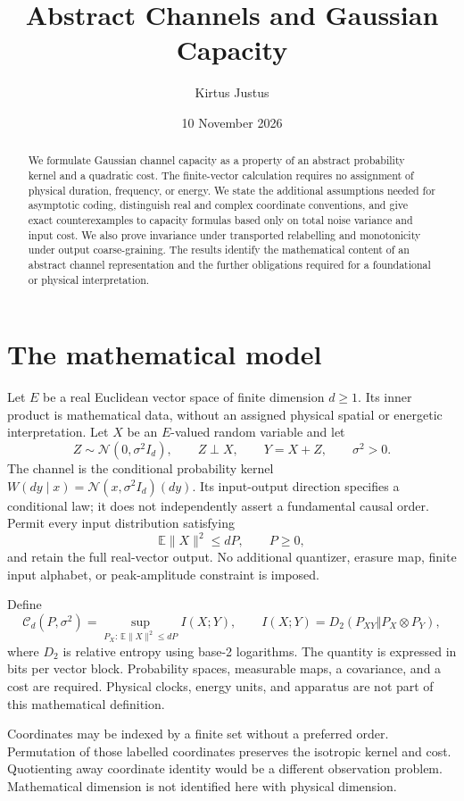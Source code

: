 \documentclass{article}
\title{Abstract Channels and Gaussian Capacity}
\author{Kirtus Justus}
\date{10 November 2026}
\begin{document}
\maketitle
\begin{abstract}
We formulate Gaussian channel capacity as a property of an abstract probability kernel and a quadratic cost. The finite-vector calculation requires no assignment of physical duration, frequency, or energy. We state the additional assumptions needed for asymptotic coding, distinguish real and complex coordinate conventions, and give exact counterexamples to capacity formulas based only on total noise variance and input cost. We also prove invariance under transported relabelling and monotonicity under output coarse-graining. The results identify the mathematical content of an abstract channel representation and the further obligations required for a foundational or physical interpretation.
\end{abstract}

\section{The mathematical model}
Let \(E\) be a real Euclidean vector space of finite dimension \(d\ge1\). Its inner product is mathematical data, without an assigned physical spatial or energetic interpretation. Let \(X\) be an \(E\)-valued random variable and let
\[
Z\sim\mathcal N(0,\sigma^2I_d),\qquad Z\perp X,
\qquad Y=X+Z,\qquad \sigma^2>0.
\]
The channel is the conditional probability kernel \(W(dy\mid x)=\mathcal N(x,\sigma^2I_d)(dy)\). Its input-output direction specifies a conditional law; it does not independently assert a fundamental causal order. Permit every input distribution satisfying
\[
\mathbb E\|X\|^2\le dP,\qquad P\ge0,
\]
and retain the full real-vector output. No additional quantizer, erasure map, finite input alphabet, or peak-amplitude constraint is imposed.

Define
\[
\mathcal C_d(P,\sigma^2)
=\sup_{P_X:\,\mathbb E\|X\|^2\le dP} I(X;Y),
\qquad
I(X;Y)=D_2(P_{XY}\Vert P_X\otimes P_Y),
\]
where \(D_2\) is relative entropy using base-2 logarithms. The quantity is expressed in bits per vector block. Probability spaces, measurable maps, a covariance, and a cost are required. Physical clocks, energy units, and apparatus are not part of this mathematical definition.

Coordinates may be indexed by a finite set without a preferred order. Permutation of those labelled coordinates preserves the isotropic kernel and cost. Quotienting away coordinate identity would be a different observation problem. Mathematical dimension is not identified here with physical dimension.
\end{document}
